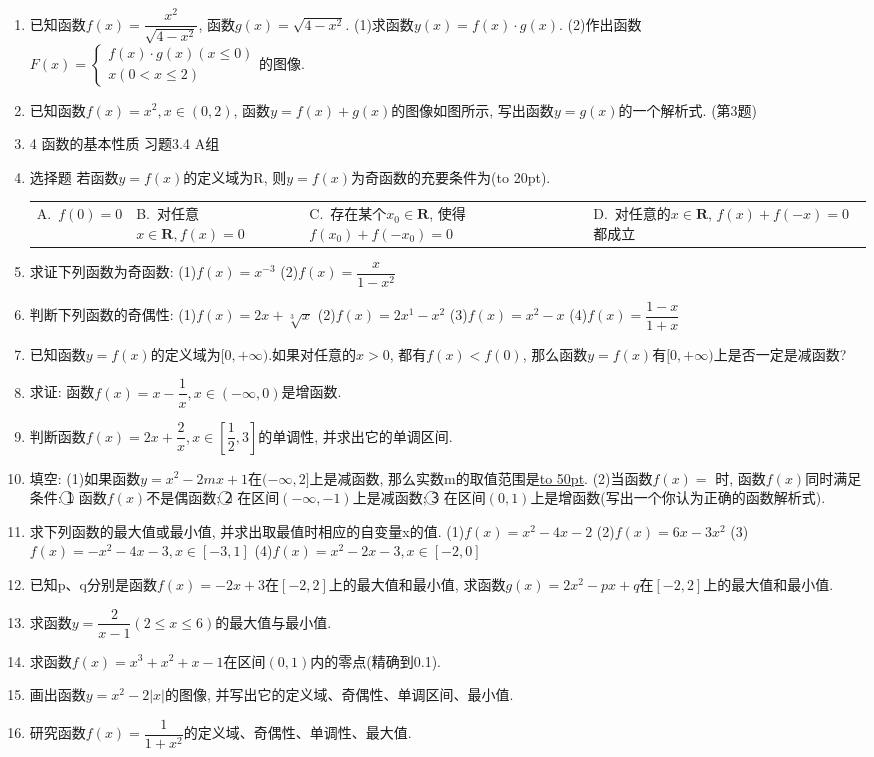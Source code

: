 \documentclass[10pt,a4paper]{article}
\newcommand{\blank}[1]{\underline{\hbox to #1pt{}}}
\newcommand{\bracket}[1]{(\hbox to #1pt{})}
\newcommand{\fourch}[4]{\par\begin{tabular}{p{.23\textwidth}p{.23\textwidth}p{.23\textwidth}p{.23\textwidth}}
A.~#1 &B.~#2& C.~#3& D.~#4
\end{tabular}}
\begin{document}
\begin{enumerate}[1.]
\item 已知函数$f(x)=\dfrac{x^2}{\sqrt {4-{x^2}}}$, 函数$g(x)=\sqrt {4-x^2}$.
(1)求函数$y(x)=f(x)\cdot g(x)$.
(2)作出函数$F(x)=\begin{cases} f(x)\cdot g(x)(x\le 0) \\ x(0<x\le 2) \end{cases}$的图像.
\item 已知函数$f(x)=x^2,x\in (0,2)$, 函数$y=f(x)+g(x)$的图像如图所示, 写出函数$y=g(x)$的一个解析式.
(第3题)
\item 4  函数的基本性质
习题3.4  A组
\item 选择题
若函数$y=f(x)$的定义域为R, 则$y=f(x)$为奇函数的充要条件为\bracket{20}.
\fourch{$f(0)=0$}{对任意$x\in \mathbf{R},f(x)=0$}{存在某个$x_0\in \mathbf{R}$, 使得$f(x_0)+f(-x_0)=0$}{对任意的$x\in \mathbf{R}$, $f(x)+f(-x)=0$都成立}
\item 求证下列函数为奇函数:
(1)$f(x)=x^{-3}$								(2)$f(x)=\dfrac x{1-x^2}$
\item 判断下列函数的奇偶性:
(1)$f(x)=2x+\sqrt[3]x$						(2)$f(x)=2x^1-x^2$
(3)$f(x)=x^2-x$							(4)$f(x)=\dfrac{1-x}{1+x}$
\item 已知函数$y=f(x)$的定义域为$[0,+\infty)$.如果对任意的$x>0$, 都有$f(x)<f(0)$, 那么函数$y=f(x)$有$[0,+\infty)$上是否一定是减函数?
\item 求证: 函数$f(x)=x-\dfrac 1x,x\in (-\infty ,0)$是增函数.
\item 判断函数$f(x)=2x+\dfrac 2x,x\in [\dfrac 12,3]$的单调性, 并求出它的单调区间.
\item 填空:
(1)如果函数$y=x^2-2mx+1$在$(-\infty ,2]$上是减函数, 那么实数m的取值范围是\blank{50}.
(2)当函数$f(x)=$				时, 函数$f(x)$同时满足条件: \textcircled{1} 函数$f(x)$不是偶函数; \textcircled{2} 在区间$(-\infty ,-1)$上是减函数; \textcircled{3} 在区间$(0,1)$上是增函数(写出一个你认为正确的函数解析式).
\item 求下列函数的最大值或最小值, 并求出取最值时相应的自变量x的值.
(1)$f(x)=x^2-4x-2$
(2)$f(x)=6x-3x^2$
(3)$f(x)=-x^2-4x-3,x\in [-3,1]$
(4)$f(x)=x^2-2x-3,x\in [-2,0]$
\item 已知p、q分别是函数$f(x)=-2x+3$在$[-2,2]$上的最大值和最小值, 求函数$g(x)=2x^2-px+q$在$[-2,2]$上的最大值和最小值.
\item 求函数$y=\dfrac 2{x-1}(2\le x\le 6)$的最大值与最小值.
\item 求函数$f(x)=x^3+x^2+x-1$在区间$(0,1)$内的零点(精确到0.1).
\item 画出函数$y=x^2-2|x|$的图像, 并写出它的定义域、奇偶性、单调区间、最小值.
\item 研究函数$f(x)=\dfrac 1{1+x^2}$的定义域、奇偶性、单调性、最大值.

\end{enumerate}
\end{document}
